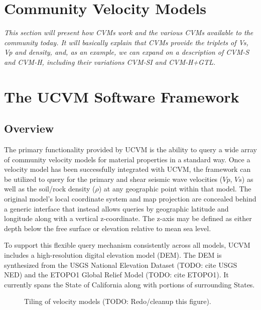 


\section{Community Velocity Models}
\label{sec:cvms}

\textit{
\color{blue}
This section will present how CVMs work and the various CVMs available to the community today. It will basically explain that CVMs provide the triplets of Vs, Vp and density, and, as an example, we can expand on a description of CVM-S and CVM-H, including their variations CVM-SI and CVM-H+GTL.
}

\section{The UCVM Software Framework}\label{sec:ucvm}

\subsection{Overview}
The primary functionality provided by UCVM is the ability to query a wide array of community velocity models for material properties in a standard way. Once a velocity model has been successfully integrated with UCVM, the framework can be utilized to query for the primary and shear seismic wave velocities ($Vp$, $Vs$) as well as the soil/rock density ($\rho$) at any geographic point within that model. The original model's local coordinate system and map projection are concealed behind a generic interface that instead allows queries by geographic latitude and longitude along with a vertical z-coordinate. The z-axis may be defined as either depth below the free surface or elevation relative to mean sea level.

To support this flexible query mechanism consistently across all models, UCVM includes a high-resolution digital elevation model (DEM). The DEM is synthesized from the USGS National Elevation Dataset (TODO: cite USGS NED) and the ETOPO1 Global Relief Model (TODO: cite ETOPO1). It currently spans the State of California along with portions of surrounding States. 
\begin{figure}
\centering
{}
\caption{Tiling of velocity models (TODO: Redo/cleanup this figure).}\label{fig:tiling}
\end{figure}

